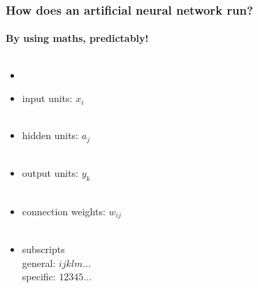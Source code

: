 \documentclass{beamer}
\begin{document}
\begin{frame}
\frametitle{How does an artificial neural network run?}
\framesubtitle{By using maths, predictably!}
  \begin{columns}[T]
    \begin{column}{.45\textwidth}

     \begin{itemize}
\item {} 

     
     \ \\
     
     
     \item<3-> \textcolor{inputred}{input units:} $x_i$
          \ \\
     \ \\
     
     \item<4-> \textcolor{hiddenblue}{hidden units:} $a_j$
     \ \\
     \ \\
     
     \item<5-> \textcolor{outputgreen}{output units:} $y_k$
     \ \\
     \ \\
     \item<6-> connection weights:  $w_{ij}$ 
          \ \\
     \ \\
     \item<7-> subscripts \\ general: ${ijklm...}$ \\ specific: ${12345...}$

     \end{itemize}

    

\end{column}
\end{columns}
\end{frame}
\end{document}
